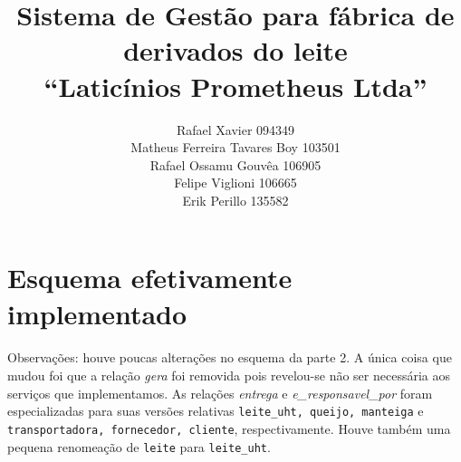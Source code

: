 \documentclass[11pt]{article}
\newcommand{\tit}[1]{\textit{#1}}
\newcommand{\ttt}[1]{\texttt{#1}}
\begin{document}
\title{Sistema de Gestão para fábrica de derivados do leite\\
	``Laticínios Prometheus Ltda''}
\author{Rafael Xavier 094349\\
	Matheus Ferreira Tavares Boy 103501\\
	Rafael Ossamu Gouvêa 106905\\
	Felipe Viglioni 106665\\
	Erik Perillo 135582}
\date{}
\maketitle

\newpage

\section{Esquema efetivamente implementado}
\paragraph{}
Observações: houve poucas alterações no esquema da parte 2. 
A única coisa que mudou foi que a relação \tit{gera} foi removida pois 
revelou-se não ser necessária aos serviços que implementamos.
As relações \tit{entrega} e \tit{e\_responsavel\_por} foram especializadas
para suas versões relativas \ttt{leite\_uht, queijo, manteiga} e 
\ttt{transportadora, fornecedor, cliente}, respectivamente. Houve também
uma pequena renomeação de \ttt{leite} para \ttt{leite\_uht}.
\end{document}
